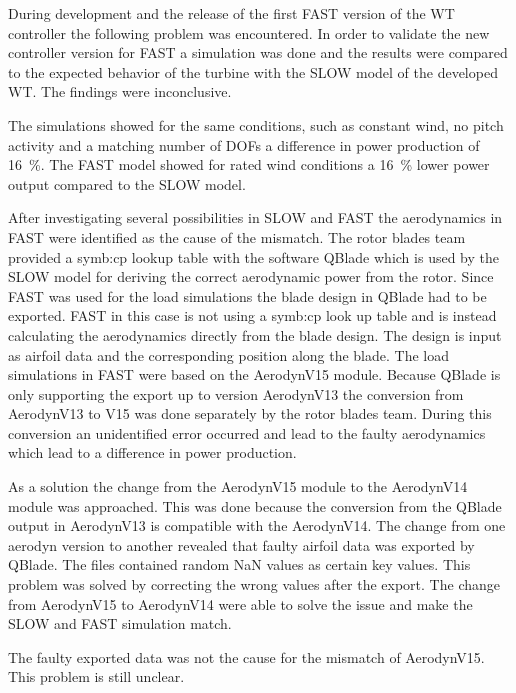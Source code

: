 During development and the release of the first \gls{FAST} version of the \gls{WT} controller the following problem was encountered.
In order to validate the new controller version for \gls{FAST} a simulation was done and the results were compared to the expected behavior of the turbine with the \gls{SLOW} model of the developed \gls{WT}.
The findings were inconclusive.

The simulations showed for the same conditions, such as constant wind, no pitch activity and a matching number of DOFs a difference in power production of \SI{16}{\%}.
The \gls{FAST} model showed for rated wind conditions a \SI{16}{\%} lower power output compared to the \gls{SLOW} model.

After investigating several possibilities in \gls{SLOW} and \gls{FAST} the aerodynamics in \gls{FAST} were identified as the cause of the mismatch.
The rotor blades team provided a \gls{symb:cp} lookup table with the software QBlade which is used by the \gls{SLOW} model for deriving the correct aerodynamic power from the rotor.
Since \gls{FAST} was used for the load simulations the blade design in QBlade had to be exported. \gls{FAST} in this case is not using a \gls{symb:cp} look up table and is instead calculating the aerodynamics directly from the blade design.
The design is input as airfoil data and the corresponding position along the blade.
The load simulations in FAST were based on the AerodynV15 module.
Because QBlade is only supporting the export up to version AerodynV13 the conversion from AerodynV13 to V15 was done separately by the rotor blades team.
During this conversion an unidentified error occurred and lead to the faulty aerodynamics which lead to a difference in power production.

As a solution the change from the AerodynV15 module to the AerodynV14 module was approached.
This was done because the conversion from the QBlade output in AerodynV13 is compatible with the AerodynV14.
The change from one aerodyn version to another revealed that faulty airfoil data was exported by QBlade.
The files contained random NaN values as certain key values.
This problem was solved by correcting the wrong values after the export.
The change from AerodynV15 to AerodynV14 were able to solve the issue and make the \gls{SLOW} and \gls{FAST} simulation match.

The faulty exported data was not the cause for the mismatch of AerodynV15. This problem is still unclear. 

